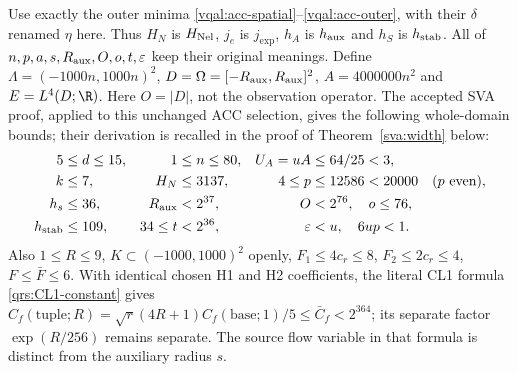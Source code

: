 Use exactly the outer minima \eqref{vqal:acc-spatial}--\eqref{vqal:acc-outer},
with their $\delta$ renamed $\eta$ here. Thus $H_N$ is $H_{\rm Nel}$,
$j_e$ is $j_{\exp}$, $h_A$ is $h_{\rm aux}$ and $h_S$ is
$h_{\rm stab}$. All of $n,p,a,s,R_{\rm aux},O,o,t,\varepsilon$ keep
their original meanings. Define
$\Lambda=(-1000n,1000n)^2$, $D=\Omega=[-R_{\rm aux},R_{\rm aux}]^2$,
$A=4000000n^2$ and $E=L^4(D;\R)$. Here $O=|D|$, not the observation
operator. The accepted SVA proof, applied to this unchanged ACC selection,
gives the following whole-domain bounds; their derivation is recalled
in the proof of Theorem~\ref{sva:width} below:
\begin{align}\label{sva:stagebounds}
 5&\le d\le15,&1&\le n\le80,& U_A=uA&\le64/25<3,\nonumber\\
 k&\le7,&H_N&\le3137,&4\le p&\le12586<20000\quad(p\text{ even}),\nonumber\\
 h_s&\le36,&R_{\rm aux}&<2^{37},& O&<2^{76},\quad o\le76,\nonumber\\
 h_{\rm stab}&\le109,&34\le t&<2^{36},&\varepsilon&<u,\quad6up<1.
\end{align}
Also $1\le R\le9$, $K\subset(-1000,1000)^2$ openly,
$F_1\le4c_r\le8$, $F_2\le2c_r\le4$, $F\le\bar F\le6$.
With identical chosen H1 and H2 coefficients, the literal CL1 formula
\eqref{qrs:CL1-constant} gives
$C_f(\text{tuple};R)=\sqrt r(4R+1)C_f(\text{base};1)/5\le\bar C_f<2^{364}$;
its separate factor $\exp(R/256)$ remains separate. The source flow
variable in that formula is distinct from the auxiliary radius $s$.

